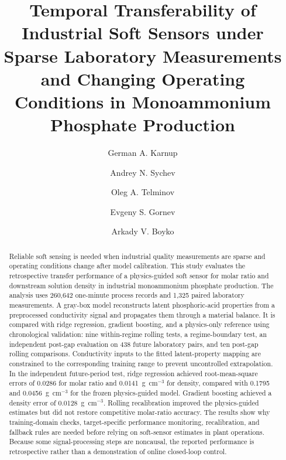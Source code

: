 \documentclass[preprint,12pt,authoryear]{elsarticle}
\begin{document}
\begin{frontmatter}

\title{Temporal Transferability of Industrial Soft Sensors under Sparse Laboratory Measurements and Changing Operating Conditions in Monoammonium Phosphate Production}

\author[mipt,meri]{German A. Karnup}

\author[ural]{Andrey N. Sychev}

\author[meri]{Oleg A. Telminov}

\author[meri]{Evgeny S. Gornev}

\author[meri]{Arkady V. Boyko}


\address[mipt]{Moscow Institute of Physics and Technology (National Research University), 9 Institutskiy Pereulok, Dolgoprudny, Moscow Region 141701, Russian Federation}
\address[meri]{Molecular Electronics Research Institute, JSC (MERI), 12, Bldg. 1, Akademika Valieva Street, Zelenograd, Moscow 124460, Russian Federation}
\address[ural]{UralAiTech LLC, 6, Bldg. 2, Presnenskaya Embankment, Presnensky Municipal District, Moscow 123112, Russian Federation}

\begin{abstract}
Reliable soft sensing is needed when industrial quality measurements are sparse and operating conditions change after model calibration. This study evaluates the retrospective transfer performance of a physics-guided soft sensor for molar ratio and downstream solution density in industrial monoammonium phosphate production. The analysis uses 260,642 one-minute process records and 1,325 paired laboratory measurements. A gray-box model reconstructs latent phosphoric-acid properties from a preprocessed conductivity signal and propagates them through a material balance. It is compared with ridge regression, gradient boosting, and a physics-only reference using chronological validation: nine within-regime rolling tests, a regime-boundary test, an independent post-gap evaluation on 438 future laboratory pairs, and ten post-gap rolling comparisons. Conductivity inputs to the fitted latent-property mapping are constrained to the corresponding training range to prevent uncontrolled extrapolation. In the independent future-period test, ridge regression achieved root-mean-square errors of 0.0286 for molar ratio and 0.0141~g~cm$^{-3}$ for density, compared with 0.1795 and 0.0456~g~cm$^{-3}$ for the frozen physics-guided model. Gradient boosting achieved a density error of 0.0128~g~cm$^{-3}$. Rolling recalibration improved the physics-guided estimates but did not restore competitive molar-ratio accuracy. The results show why training-domain checks, target-specific performance monitoring, recalibration, and fallback rules are needed before relying on soft-sensor estimates in plant operations. Because some signal-processing steps are noncausal, the reported performance is retrospective rather than a demonstration of online closed-loop control.
\end{abstract}


\end{frontmatter}
\end{document}
